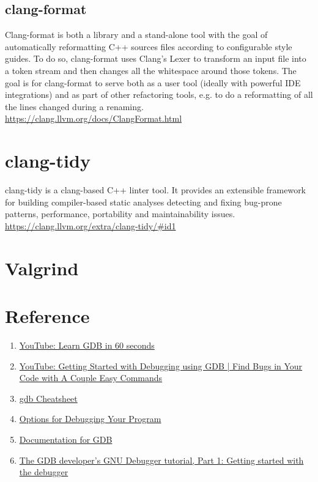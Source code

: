 \subsection{clang-format}%
\label{sub:clang_format}
Clang-format is both a library and a stand-alone tool with the goal of automatically reformatting C++ sources files according to configurable style guides. To do so, clang-format uses Clang’s Lexer to transform an input file into a token stream and then changes all the whitespace around those tokens. The goal is for clang-format to serve both as a user tool (ideally with powerful IDE integrations) and as part of other refactoring tools, e.g. to do a reformatting of all the lines changed during a renaming.
\href{ClangFormat}{https://clang.llvm.org/docs/ClangFormat.html} 


\section{clang-tidy}%
\label{sec:clang_tidy}
clang-tidy is a clang-based C++ linter tool. It provides an extensible framework for building compiler-based static analyses detecting and fixing bug-prone patterns, performance, portability and maintainability issues.
\href{clang-tidy}{https://clang.llvm.org/extra/clang-tidy/#id1} 


\section{Valgrind}


\section{Reference}
\begin{enumerate}
  \item \href{https://www.youtube.com/watch?v=mfmXcbiRs0E&list=PL9IEJIKnBJjHGWPN_S9NS_Ky1-tC8ZrUI}{YouTube: Learn GDB in 60 seconds}

  \item \href{https://www.youtube.com/watch?v=Dq8l1_-QgAc}{YouTube: Getting Started with Debugging using GDB | Find Bugs in Your Code with A Couple Easy Commands}

  \item \href{https://www.google.com/url?q=https://cs.brown.edu/courses/cs033/docs/guides/gdb.pdf&sa=D&source=docs&ust=1661288718090053&usg=AOvVaw3EbYRk1zHStEJlu-FSbeiY}{gdb Cheatsheet}

  \item \href{https://gcc.gnu.org/onlinedocs/gcc/index.html#toc-GCC-Command-Options}{Options for Debugging Your Program}

  \item \href{https://sourceware.org/gdb/download/onlinedocs/}{Documentation for GDB}

  \item \href{https://developers.redhat.com/blog/2021/04/30/the-gdb-developers-gnu-debugger-tutorial-part-1-getting-started-with-the-debugger#}{The GDB developer's GNU Debugger tutorial, Part 1: Getting started with the debugger}
\end{enumerate}
